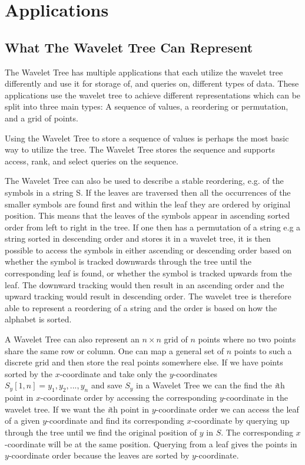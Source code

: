 \section{Applications}
\subsection{What The Wavelet Tree Can Represent}
The Wavelet Tree has multiple applications that each utilize the wavelet tree differently and use it for storage of, and queries on, different types of data.
These applications use the wavelet tree to achieve different representations which can be split into three main types: A sequence of values, a reordering or permutation, and a grid of points.

Using the Wavelet Tree to store a sequence of values is perhaps the most basic way to utilize the tree.
The Wavelet Tree stores the sequence and supports access, rank, and select queries on the sequence.

The Wavelet Tree can also be used to describe a stable reordering, e.g. of the symbols in a string S. 
If the leaves are traversed then all the occurrences of the smaller symbols are found first and within the leaf they are ordered by original position.
This means that the leaves of the symbols appear in ascending sorted order from left to right in the tree.
If one then has a permutation of a string e.g a string sorted in descending order and stores it in a wavelet tree, it is then possible to access the symbols in either ascending or descending order based on whether the symbol is tracked downwards through the tree until the corresponding leaf is found, or whether the symbol is tracked upwards from the leaf. 
The downward tracking would then result in an ascending order and the upward tracking would result in descending order.
The wavelet tree is therefore able to represent a reordering of a string and the order is based on how the alphabet is sorted.

A Wavelet Tree can also represent an $n \times n$ grid of $n$ points where no two points share the same row or column. 
One can map a general set of $n$ points to such a discrete grid and then store the real points somewhere else. If we have points sorted by the $x$-coordinate and take only the $y$-coordinates $S_y[1,n] = y_1,y_2,...,y_n$ and save $S_y$ in a Wavelet Tree we can the find the \textit{i}th point in $x$-coordinate order by accessing the corresponding $y$-coordinate in the wavelet tree. 
If we want the \textit{i}th point in $y$-coordinate order we can access the leaf of a given $y$-coordinate and find its corresponding $x$-coordinate by querying up through the tree until we find the original position of $y$ in $S$. 
The corresponding $x$-coordinate will be at the same position.
Querying from a leaf gives the points in $y$-coordinate order because the leaves are sorted by $y$-coordinate.

